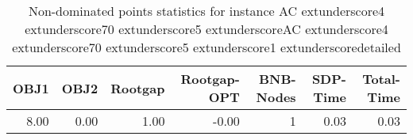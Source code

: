 \begin{table}
\caption{Non-dominated points statistics for instance AC	extunderscore4	extunderscore70	extunderscore5	extunderscoreAC	extunderscore4	extunderscore70	extunderscore5	extunderscore1	extunderscoredetailed}
\label{tab:stats/AC_4_70_5_AC_4_70_5_1_detailed}
\begin{tabular}{rrrrrrr}
\toprule
OBJ1 & OBJ2 & Rootgap & Rootgap-OPT & BNB-Nodes & SDP-Time & Total-Time \\
\midrule
8.00 & 0.00 & 1.00 & -0.00 & 1 & 0.03 & 0.03 \\
\bottomrule
\end{tabular}
\end{table}
